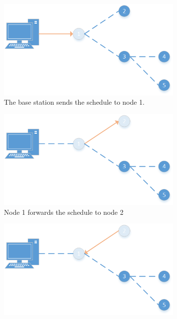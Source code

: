 \begin{figure}[htbp]
	\centering
	\begin{subfigure}[t]{0.4\textwidth}
		\centering
    		\includegraphics[scale=0.6]{content/images/ScheduleSpreading/Part1}
   	 	\caption{The base station sends the schedule to node 1.}
    	\label{fig:spreading1}
    \end{subfigure}
    \quad
    \quad
    \begin{subfigure}[t]{0.4\textwidth}
		\centering         
        \includegraphics[scale=0.6]{content/images/ScheduleSpreading/Part2}
        \caption{Node 1 forwards the schedule to node 2}
        \label{fig:spreading2}
    \end{subfigure}
    \quad
    \quad
    \begin{subfigure}[t]{0.4\textwidth}
		\centering         
        \includegraphics[scale=0.6]{content/images/ScheduleSpreading/Part3}

\end{subfigure}
\end{figure}
